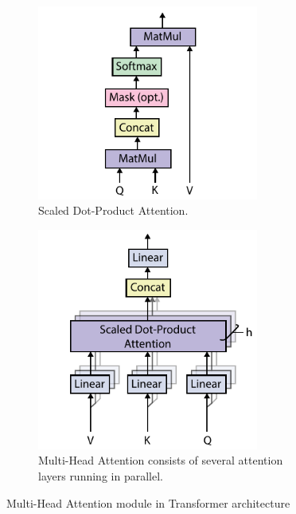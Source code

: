 \begin{figure}[htp]
    \centering
    \begin{subfigure}[b]{0.5\textwidth}
        \centering
        \includegraphics[width=0.8\textwidth,keepaspectratio]{figures/scaled_dot-product_attention.pdf}
        \caption{Scaled Dot-Product Attention.}
        \label{fig:scaled-dotproduct-attention}
    \end{subfigure}%
    \hfill
    \begin{subfigure}[b]{0.5\textwidth}
        \centering
        \includegraphics[width=0.8\textwidth,keepaspectratio]{figures/multi-head_attention.pdf}
        \caption{Multi-Head Attention consists of several attention layers running in parallel.}
        \label{fig:multihead-attention}
    \end{subfigure}%
    \caption{Multi-Head Attention module in Transformer architecture \textcite{vaswani2017attention}}
    \label{fig:transformer-architecture-details}
\end{figure}

